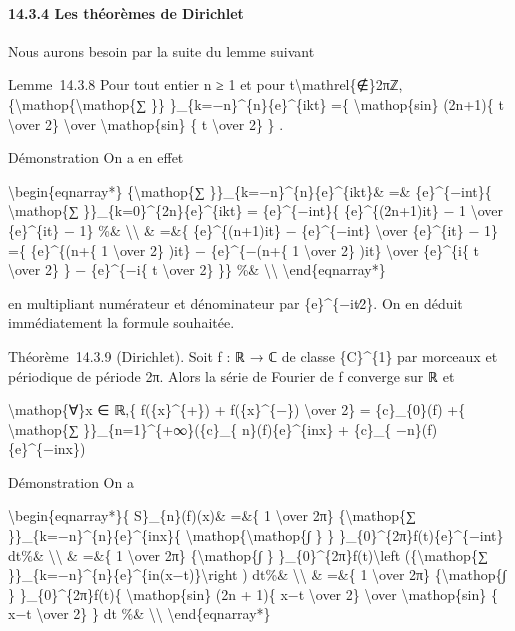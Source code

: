 \documentclass[]{article}
\begin{document}
\paragraph{14.3.4 Les théorèmes de Dirichlet}

Nous aurons besoin par la suite du lemme suivant

Lemme~14.3.8 Pour tout entier n ≥ 1 et pour
t\textbackslash{}mathrel\{∉\}2πℤ,
\{\textbackslash{}mathop\{\textbackslash{}mathop\{∑ \}\}
\}\_\{k=−n\}\^{}\{n\}\{e\}\^{}\{ikt\} =\{ \textbackslash{}mathop\{sin\}
(2n+1)\{ t \textbackslash{}over 2\} \textbackslash{}over
\textbackslash{}mathop\{sin\} \{ t \textbackslash{}over 2\} \} .

Démonstration On a en effet

\textbackslash{}begin\{eqnarray*\} \{\textbackslash{}mathop\{∑
\}\}\_\{k=−n\}\^{}\{n\}\{e\}\^{}\{ikt\}\& =\& \{e\}\^{}\{−int\}\{
\textbackslash{}mathop\{∑ \}\}\_\{k=0\}\^{}\{2n\}\{e\}\^{}\{ikt\} =
\{e\}\^{}\{−int\}\{ \{e\}\^{}\{(2n+1)it\} − 1 \textbackslash{}over
\{e\}\^{}\{it\} − 1\} \%\& \textbackslash{}\textbackslash{} \& =\&\{
\{e\}\^{}\{(n+1)it\} − \{e\}\^{}\{−int\} \textbackslash{}over
\{e\}\^{}\{it\} − 1\} =\{ \{e\}\^{}\{(n+\{ 1 \textbackslash{}over 2\}
)it\} − \{e\}\^{}\{−(n+\{ 1 \textbackslash{}over 2\} )it\}
\textbackslash{}over \{e\}\^{}\{i\{ t \textbackslash{}over 2\} \} −
\{e\}\^{}\{−i\{ t \textbackslash{}over 2\} \}\} \%\&
\textbackslash{}\textbackslash{} \textbackslash{}end\{eqnarray*\}

en multipliant numérateur et dénominateur par \{e\}\^{}\{−it∕2\}. On en
déduit immédiatement la formule souhaitée.

Théorème~14.3.9 (Dirichlet). Soit f : ℝ → ℂ de classe \{C\}\^{}\{1\} par
morceaux et périodique de période 2π. Alors la série de Fourier de f
converge sur ℝ et

\textbackslash{}mathop\{∀\}x ∈ ℝ,\{ f(\{x\}\^{}\{+\}) +
f(\{x\}\^{}\{−\}) \textbackslash{}over 2\} = \{c\}\_\{0\}(f) +\{
\textbackslash{}mathop\{∑ \}\}\_\{n=1\}\^{}\{+∞\}(\{c\}\_\{
n\}(f)\{e\}\^{}\{inx\} + \{c\}\_\{ −n\}(f)\{e\}\^{}\{−inx\})

Démonstration On a

\textbackslash{}begin\{eqnarray*\}\{ S\}\_\{n\}(f)(x)\& =\&\{ 1
\textbackslash{}over 2π\} \{\textbackslash{}mathop\{∑
\}\}\_\{k=−n\}\^{}\{n\}\{e\}\^{}\{inx\}\{
\textbackslash{}mathop\{\textbackslash{}mathop\{∫ \} \}
\}\_\{0\}\^{}\{2π\}f(t)\{e\}\^{}\{−int\} dt\%\&
\textbackslash{}\textbackslash{} \& =\&\{ 1 \textbackslash{}over 2π\}
\{\textbackslash{}mathop\{∫ \}
\}\_\{0\}\^{}\{2π\}f(t)\textbackslash{}left (\{\textbackslash{}mathop\{∑
\}\}\_\{k=−n\}\^{}\{n\}\{e\}\^{}\{in(x−t)\}\textbackslash{}right )
dt\%\& \textbackslash{}\textbackslash{} \& =\&\{ 1 \textbackslash{}over
2π\} \{\textbackslash{}mathop\{∫ \} \}\_\{0\}\^{}\{2π\}f(t)\{
\textbackslash{}mathop\{sin\} (2n + 1)\{ x−t \textbackslash{}over 2\}
\textbackslash{}over \textbackslash{}mathop\{sin\} \{ x−t
\textbackslash{}over 2\} \} dt \%\& \textbackslash{}\textbackslash{}
\textbackslash{}end\{eqnarray*\}
\end{document}
